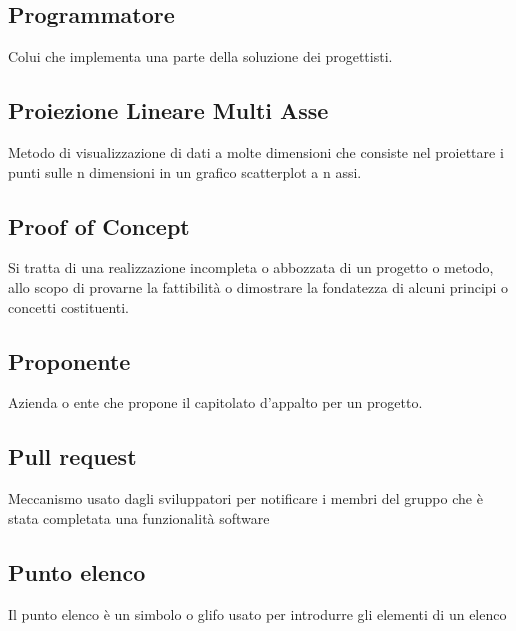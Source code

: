\documentclass[../glossario.tex]{subfiles}
\begin{document}
\subsection*{Programmatore} 
Colui che implementa una parte della soluzione dei progettisti.

\subsection*{Proiezione Lineare Multi Asse}
Metodo di visualizzazione di dati a molte dimensioni che consiste nel proiettare i punti sulle n dimensioni in un grafico scatterplot a n assi. 

\subsection*{Proof of Concept} 
Si tratta di una realizzazione incompleta o abbozzata di un progetto o metodo, allo scopo di provarne la fattibilità o dimostrare la fondatezza di alcuni principi o concetti costituenti.

\subsection*{Proponente} 
Azienda o ente che propone il capitolato d'appalto per un progetto.

\subsection*{Pull request} 
Meccanismo usato dagli sviluppatori per notificare i membri del gruppo che è stata completata una funzionalità software

\subsection*{Punto elenco} 
Il punto elenco è un simbolo o glifo usato per introdurre gli elementi di un elenco

    
\end{document}

